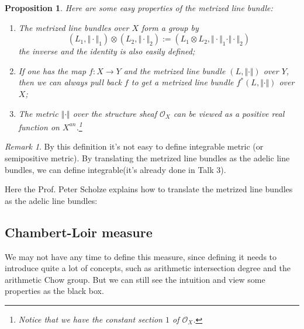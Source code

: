 \documentclass[reqno,11pt]{amsart}
\numberwithin{equation}{section}
\theoremstyle{plain}
\newtheorem{proposition}[theorem]{Proposition}
\theoremstyle{plain}
\numberwithin{equation}{section}
\theoremstyle{remark}
\newtheorem{remark}[theorem]{Remark}
\newcommand{\norm}[1]{\Vert{#1}\Vert}
\begin{document}
\begin{proposition}
Here are some easy properties of the metrized line bundle:
\begin{enumerate}[(1)]
\item The metrized line bundles over $X$ form a group by
$$(L_1,\norm{\cdot}_1) \otimes (L_2,\norm{\cdot}_2):=(L_1 \otimes L_2, \norm{\cdot}_1\cdot \norm{\cdot}_2)$$
the inverse and the identity is also easily defined;
\item If one has the map $f:X \longrightarrow Y$ and the metrized line bundle $(L,\norm{\cdot})$ over $Y$, then we can always pull back $f$ to get a metrized line bundle $f^*(L,\norm{\cdot})$ over $X$;
\item The metric $\norm{\cdot}$ over the structure sheaf $\mathcal{O}_X$ can be viewed as a positive real function on $X^{an}$.\footnote{Notice that we have the constant section $1$ of $\mathcal{O}_X$.}
\end{enumerate} 
\end{proposition}
\begin{remark}
By this definition it's not easy to define integrable metric (or semipositive metric). By translating the metrized line bundles as the adelic line bundles, we can define integrable(it's already done in Talk 3).
\end{remark}
Here the Prof. Peter Scholze explains how to translate the metrized line bundles as the adelic line bundles:


\subsection{Chambert-Loir measure}
We may not have any time to define this measure, since defining it needs to introduce quite a lot of concepts, such as arithmetic intersection degree and the arithmetic Chow group. But we can still see the intuition and view some properties as the black box.
\end{document}
